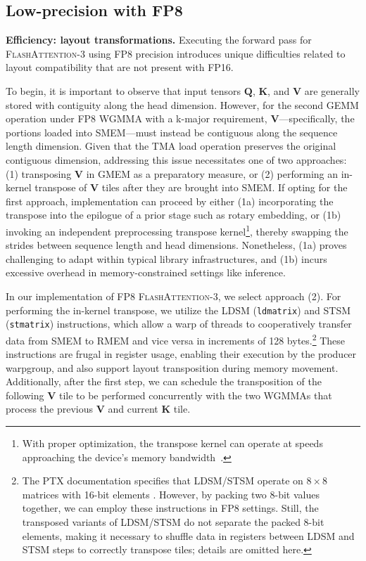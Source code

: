 \subsection{Low-precision with FP8}
\label{sec:algofp8}

\textbf{Efficiency: layout transformations.} Executing the forward pass for \textsc{FlashAttention-3} using FP8 precision introduces unique difficulties related to layout compatibility that are not present with FP16.

To begin, it is important to observe that input tensors $\mathbf{Q}$, $\mathbf{K}$, and $\mathbf{V}$ are generally stored with contiguity along the head dimension. However, for the second GEMM operation under FP8 WGMMA with a k-major requirement, $\mathbf{V}$—specifically, the portions loaded into SMEM—must instead be contiguous along the sequence length dimension. Given that the TMA load operation preserves the original contiguous dimension, addressing this issue necessitates one of two approaches: (1) transposing $\mathbf{V}$ in GMEM as a preparatory measure, or (2) performing an in-kernel transpose of $\mathbf{V}$ tiles after they are brought into SMEM. If opting for the first approach, implementation can proceed by either (1a) incorporating the transpose into the epilogue of a prior stage such as rotary embedding, or (1b) invoking an independent preprocessing transpose kernel\footnote{With proper optimization, the transpose kernel can operate at speeds approaching the device's memory bandwidth~\citep{colfax_cutlass_transpose_2024}.}, thereby swapping the strides between sequence length and head dimensions. Nonetheless, (1a) proves challenging to adapt within typical library infrastructures, and (1b) incurs excessive overhead in memory-constrained settings like inference.

In our implementation of FP8 \textsc{FlashAttention-3}, we select approach (2). For performing the in-kernel transpose, we utilize the LDSM (\verb|ldmatrix|) and STSM (\verb|stmatrix|) instructions, which allow a warp of threads to cooperatively transfer data from SMEM to RMEM and vice versa in increments of 128 bytes.\footnote{The PTX documentation specifies that LDSM/STSM operate on $8 \times 8$ matrices with 16-bit elements \cite[\S 9.7.13.4.15-16]{ptx}. However, by packing two 8-bit values together, we can employ these instructions in FP8 settings. Still, the transposed variants of LDSM/STSM do not separate the packed 8-bit elements, making it necessary to shuffle data in registers between LDSM and STSM steps to correctly transpose tiles; details are omitted here.} These instructions are frugal in register usage, enabling their execution by the producer warpgroup, and also support layout transposition during memory movement. Additionally, after the first step, we can schedule the transposition of the following $\mathbf{V}$ tile to be performed concurrently with the two WGMMAs that process the previous $\mathbf{V}$ and current $\mathbf{K}$ tile.

